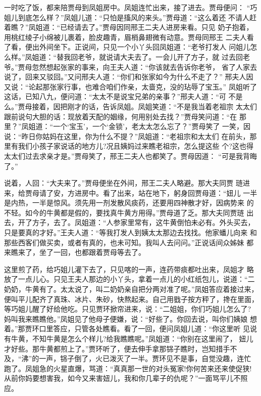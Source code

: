 一时吃了饭，都来陪贾母到凤姐房中。凤姐连忙出来，接了进去。贾母便问：
“巧姐儿到底怎么样？”凤姐儿道：“只怕是搐风的来头。”贾母道：“这么着还
不请人赶着瞧？”凤姐道：“已经请去了。”贾母因同邢王二夫人进房来看。只见
奶子抱着，用桃红绫子小绵被儿裹着，脸皮趣青，眉梢鼻翅微有动意。贾母同邢王
二夫人看了看，便出外间坐下。正说间，只见一个小丫头回凤姐道：“老爷打发人
问姐儿怎么样。”凤姐道：“替我回老爷，就说请大夫去了。一会儿开了方子，就
过去回老爷。”贾母忽然想起张家的事来，向王夫人道：“你该就去告诉你老爷，
省了人家去说了，回来又驳回。”又问邢夫人道：“你们和张家如今为什么不走了？”
邢夫人因又说：“论起那张家行事，也难合咱们作亲，太啬克，没的玷辱了宝玉。”
凤姐听了这话，已知八九，便问道：“太太不是说宝兄弟的亲事？”邢夫人道：“可
不是么。”贾母接着，因把刚才的话，告诉凤姐。凤姐笑道：“不是我当着老祖宗
太太们跟前说句大胆的话：现放着天配的姻缘，何用别处去找？”贾母笑问道：“在
那里？”凤姐道：“一个‘宝玉’，一个‘金锁’，老太太怎么忘了？”贾母笑了
一笑，因说：“昨日你姑妈在这里，你为什么不提？”凤姐道：“老祖宗和太太们
在前头，那里有我们小孩子家说话的地方儿?况且姨妈过来瞧老祖宗，怎么提这些
个?这也得太太们过去求亲才是。”贾母笑了，邢王二夫人也都笑了。贾母因道：
“可是我背晦了。”

说着，人回：“大夫来了。”贾母便坐在外间，邢王二夫人略避。那大夫同贾
琏进来，给贾母请了安，方进房中。看了出来，站在地下，躬身回贾母道：“妞儿
一半是内热，一半是惊风。须先用一剂发散风痰药，还要用四神散才好，因病势来
的不轻。如今的牛黄都是假的，要找真牛黄方用得。”贾母道了乏。那大夫同贾琏
出去，开了方子，去了。凤姐道：“人参家里常有，这牛黄倒怕未必有。外头买去，
只是要真的才好。”王夫人道：“等我打发人到姨太太那边去找找。他家蟠儿向来
和那些西客们做买卖，或者有真的，也未可知。我叫人去问问。”正说话间众姊妹
都来瞧来了，坐了一回，也都跟着贾母等去了。

这里煎了药，给巧姐儿灌下去了，只见喀的一声，连药带痰都吐出来，凤姐才
略放了一点儿心。只见王夫人那边的小丫头，拿着一点儿的小红纸包儿，说道：“二
奶奶，牛黄有了。太太说了，叫二奶奶亲自把分两对准了呢。”凤姐答应着接过来，
便叫平儿配齐了真珠、冰片、朱砂，快熬起来。自己用戥子按方秤了，搀在里面，
等巧姐儿醒了好给他吃。只见贾环掀帘进来，说：“二姐姐，你们巧姐儿怎么了?
妈叫我来瞧瞧他。”凤姐见了他母子便嫌，说：“好些了。你回去说，叫你们姨娘
想着。”那贾环口里答应，只管各处瞧看。看了一回，便问凤姐儿道：“你这里听
见说有牛黄，不知牛黄是怎么个样儿?给我瞧瞧呢。”凤姐道：“你别在这里闹了，
妞儿才好些。那牛黄都煎上了。”贾环听了，便去伸手拿那铞子瞧时，岂知措手不
及，“沸”的一声，铞子倒了，火已泼灭了一半。贾环见不是事，自觉没趣，连忙
跑了。凤姐急的火星直爆，骂道：“真真那一世的对头冤家!你何苦来还来使促狭!
从前你妈要想害我，如今又来害妞儿，我和你几辈子的仇呢？”一面骂平儿不照应。

